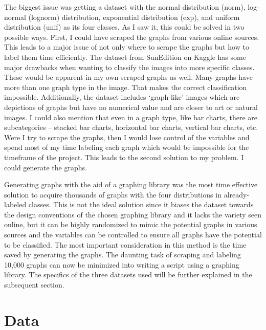 \documentclass[12pt]{article}
\begin{document}
            The biggest issue was getting a dataset with the normal distribution (norm), log-normal (lognorm) distribution, 
            exponential distribution (exp), and uniform distribution (unif) as its four classes. 
            As I saw it, this could be solved in two possible ways. 
            First, I could have scraped the graphs from various online sources. 
            This leads to a major issue of not only where to scrape the graphs but how to label them time efficiently. 
            The dataset from SunEdition on Kaggle has some major drawbacks when wanting to classify the images into more specific classes. 
            These would be apparent in my own scraped graphs as well. Many graphs have more than one graph type in the image. 
            That makes the correct classification impossible. Additionally, the dataset includes ‘graph-like’ images 
            which are depictions of graphs but have no numerical value and are closer to art or natural images. 
            I could also mention that even in a graph type, like bar charts, there are subcategories -- stacked bar charts, 
            horizontal bar charts, vertical bar charts, etc. 
            Were I try to scrape the graphs, then I would lose control of the variables 
            and spend most of my time labeling each graph which would be impossible for the timeframe of the project. 
            This leads to the second solution to my problem. I could generate the graphs.
        
            Generating graphs with the aid of a graphing library was the most time effective solution to acquire thousands of graphs 
            with the four distributions in already-labeled classes. 
            This is not the ideal solution since it biases the dataset towards the design conventions of the chosen graphing library 
            and it lacks the variety seen online, but it can be highly randomized to mimic the potential graphs in various sources 
            and the variables can be controlled to ensure all graphs have the potential to be classified. 
            The most important consideration in this method is the time saved by generating the graphs. 
            The daunting task of scraping and labeling 10,000 graphs can now be minimized into writing a script using a graphing library. 
            The specifics of the three datasets used will be further explained in the subsequent section.
        
        
    \newpage \section{Data}
            
\end{document}
